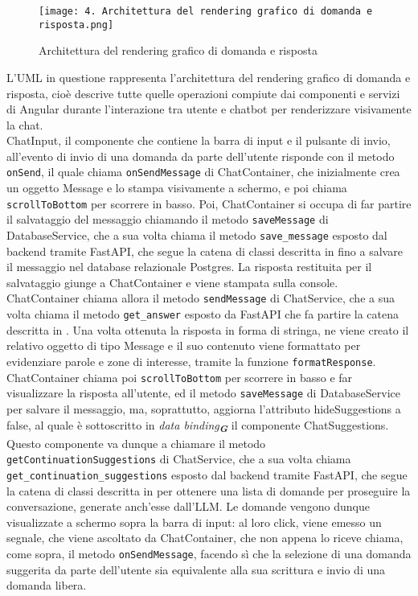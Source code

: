 \begin{figure}[h]
    \centering
    \texttt{[image: 4. Architettura del rendering grafico di domanda e risposta.png]}
    \caption{Architettura del rendering grafico di domanda e risposta}
\end{figure}

L'UML in questione rappresenta l'architettura del rendering grafico di domanda e risposta, cioè descrive tutte quelle operazioni compiute dai componenti e servizi di Angular durante l'interazione tra utente e chatbot per renderizzare visivamente la chat.\\
ChatInput, il componente che contiene la barra di input e il pulsante di invio, all'evento di invio di una domanda da parte dell'utente risponde con il metodo \texttt{onSend}, il quale chiama \texttt{onSendMessage} di ChatContainer, che inizialmente crea un oggetto Message e lo stampa visivamente a schermo, e poi chiama \texttt{scrollToBottom} per scorrere in basso. Poi, ChatContainer si occupa di far partire il salvataggio del messaggio chiamando il metodo \texttt{saveMessage} di DatabaseService, che a sua volta chiama il metodo \texttt{save\_message} esposto dal backend tramite FastAPI, che segue la catena di classi descritta in  fino a salvare il messaggio nel database relazionale Postgres. La risposta restituita per il salvataggio giunge a ChatContainer e viene stampata sulla console. ChatContainer chiama allora il metodo \texttt{sendMessage} di ChatService, che a sua volta chiama il metodo \texttt{get\_answer} esposto da FastAPI che fa partire la catena descritta in . Una volta ottenuta la risposta in forma di stringa, ne viene creato il relativo oggetto di tipo Message e il suo contenuto viene formattato per evidenziare parole e zone di interesse, tramite la funzione \texttt{formatResponse}. ChatContainer chiama poi \texttt{scrollToBottom} per scorrere in basso e far visualizzare la risposta all'utente, ed il metodo \texttt{saveMessage} di DatabaseService per salvare il messaggio, ma, soprattutto, aggiorna l'attributo hideSuggestions a false, al quale è sottoscritto in \emph{data binding}\textsubscript{\textbf{\textit{G}}} il componente ChatSuggestions. Questo componente va dunque a chiamare il metodo \texttt{getContinuationSuggestions} di ChatService, che a sua volta chiama \texttt{get\_continuation\_suggestions} esposto dal backend tramite FastAPI, che segue la catena di classi descritta in  per ottenere una lista di domande per proseguire la conversazione, generate anch'esse dall'LLM. Le domande vengono dunque visualizzate a schermo sopra la barra di input: al loro click, viene emesso un segnale, che viene ascoltato da ChatContainer, che non appena lo riceve chiama, come sopra, il metodo \texttt{onSendMessage}, facendo sì che la selezione di una domanda suggerita da parte dell'utente sia equivalente alla sua scrittura e invio di una domanda libera.

